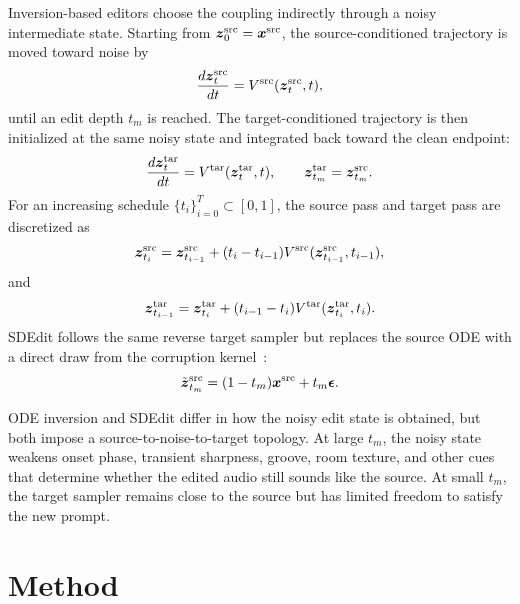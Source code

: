 Inversion-based editors choose the coupling indirectly through a noisy intermediate state.
Starting from $\boldsymbol{z}^{\mathrm{src}}_0=\boldsymbol{x}^{\mathrm{src}}$, the source-conditioned trajectory is moved toward noise by
\begin{equation}
    \label{eq:audio_inv_forward}
    \frac{d\boldsymbol{z}^{\mathrm{src}}_t}{dt}
    =
    V^{\mathrm{src}}(\boldsymbol{z}^{\mathrm{src}}_t,t),
\end{equation}
until an edit depth $t_m$ is reached.
The target-conditioned trajectory is then initialized at the same noisy state and integrated back toward the clean endpoint:
\begin{equation}
    \label{eq:audio_inv_reverse}
    \frac{d\boldsymbol{z}^{\mathrm{tar}}_t}{dt}
    =
    V^{\mathrm{tar}}(\boldsymbol{z}^{\mathrm{tar}}_t,t),
    \qquad
    \boldsymbol{z}^{\mathrm{tar}}_{t_m}=\boldsymbol{z}^{\mathrm{src}}_{t_m}.
\end{equation}
For an increasing schedule $\{t_i\}_{i=0}^{T}\subset[0,1]$, the source pass and target pass are discretized as
\begin{equation}
    \label{eq:audio_inv_forward_discrete}
    \boldsymbol{z}_{t_i}^{\mathrm{src}}
    =
    \boldsymbol{z}_{t_{i-1}}^{\mathrm{src}}
    +(t_i-t_{i-1})
    V^{\mathrm{src}}(\boldsymbol{z}_{t_{i-1}}^{\mathrm{src}},t_{i-1}),
\end{equation}
and
\begin{equation}
    \label{eq:audio_inv_reverse_discrete}
    \boldsymbol{z}_{t_{i-1}}^{\mathrm{tar}}
    =
    \boldsymbol{z}_{t_i}^{\mathrm{tar}}
    +(t_{i-1}-t_i)
    V^{\mathrm{tar}}(\boldsymbol{z}_{t_i}^{\mathrm{tar}},t_i).
\end{equation}
SDEdit follows the same reverse target sampler but replaces the source ODE with a direct draw from the corruption kernel~\cite{meng2022sdeditguidedimagesynthesis}:
\begin{equation}
    \label{eq:audio_sdedit_noise}
    \tilde{\boldsymbol{z}}_{t_m}^{\mathrm{src}}
    =
    (1-t_m)\boldsymbol{x}^{\mathrm{src}}+t_m\boldsymbol{\epsilon}.
\end{equation}

ODE inversion and SDEdit differ in how the noisy edit state is obtained, but both impose a source-to-noise-to-target topology.
At large $t_m$, the noisy state weakens onset phase, transient sharpness, groove, room texture, and other cues that determine whether the edited audio still sounds like the source.
At small $t_m$, the target sampler remains close to the source but has limited freedom to satisfy the new prompt.

\section{Method}

